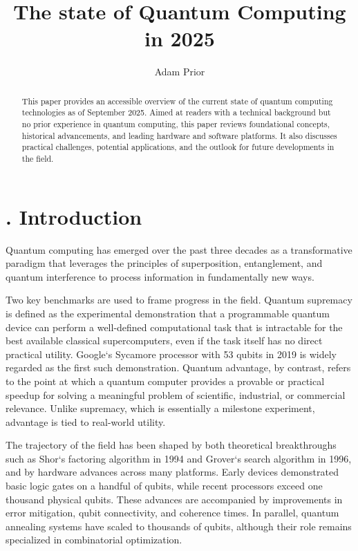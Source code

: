 \documentclass{elbioimp2}
\title{The state of Quantum Computing in 2025}
\author{Adam Prior\affiliation{UrbanFox, Dublin, Ireland}}
\begin{document}
\setcounter{secnumdepth}{2}


\maketitle

\begin{abstract}
This paper provides an accessible overview of the current state of quantum computing technologies as of September 2025. Aimed at readers with a technical background but no prior experience in quantum computing, this paper reviews foundational concepts, historical advancements, and leading hardware and software platforms. It also discusses practical challenges, potential applications, and the outlook for future developments in the field.
\end{abstract}

\section{. Introduction}
Quantum computing has emerged over the past three decades as a transformative paradigm that
leverages the principles of superposition, entanglement, and quantum interference to process
information in fundamentally new ways.

Two key benchmarks are used to frame progress in the field. Quantum supremacy is defined as
the experimental demonstration that a programmable quantum device can perform a well-defined
computational task that is intractable for the best available classical supercomputers, even
if the task itself has no direct practical utility. Google`s Sycamore processor with 53 qubits
in 2019 is widely regarded as the first such demonstration. Quantum advantage, by contrast, refers
to the point at which a quantum computer provides a provable or practical speedup for solving a
meaningful problem of scientific, industrial, or commercial relevance. Unlike supremacy, which
is essentially a milestone experiment, advantage is tied to real-world utility.

The trajectory of the field has been shaped by both theoretical breakthroughs such as Shor`s
factoring algorithm in 1994 and Grover`s search algorithm in 1996, and by hardware advances
across many platforms. Early devices demonstrated basic logic gates on a handful of qubits, while recent
processors exceed one thousand physical qubits. These advances are accompanied by improvements
in error mitigation, qubit connectivity, and coherence times. In parallel, quantum annealing systems
have scaled to thousands of qubits, although their role remains specialized in combinatorial
optimization.
\end{document}
